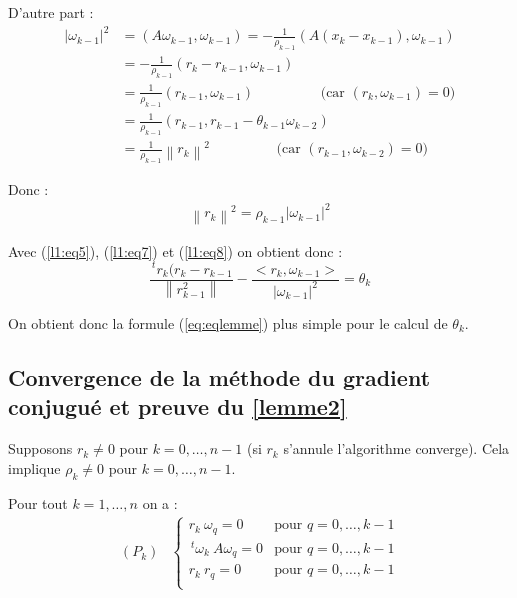 \documentclass[a4paper,11pt]{article}
\newcommand{\norm}[1]{\left\lVert#1\right\rVert}
\newcommand{\tpo}[1]{\,^t#1}
\theoremstyle{plain} %
\begin{document}
D'autre part :
\begin{align*}
    |\omega_{k-1}|^2 & = (A \omega_{k-1}, \omega_{k-1}) = -\frac{1}{\rho_{k-1}}(A (x_k - x_{k-1}), \omega_{k-1}) \\
    & = -\frac{1}{\rho_{k-1}}(r_k - r_{k-1} , \omega_{k-1}) \\
    & = \frac{1}{\rho_{k-1}}(r_{k-1}, \omega_{k-1}) \hspace{2cm} \text{(car $(r_k,\omega_{k-1}) = 0$)}\\
    & = \frac{1}{\rho_{k-1}}(r_{k-1},r_{k-1}- \theta_{k-1}\omega_{k-2}) \\
    & = \frac{1}{\rho_{k-1}}\norm{r_k}^2 \hspace{2cm} \text{(car $(r_{k-1}, \omega_{k-2}) = 0$)}
\end{align*}

Donc :
\begin{align}
    \norm{r_k}^2 = \rho_{k-1} |\omega_{k-1}|^2
    \label{l1:eq8}
\end{align}

Avec (\ref{l1:eq5}), (\ref{l1:eq7}) et (\ref{l1:eq8}) on obtient donc :
\[
    \frac{\tpo r_k (r_k - r_{k-1}}{\norm{r_{k-1}^2}}  - \frac{<r_k,\omega_{k-1}>}{|\omega_{k-1}|^2} = \theta_k
\]

On obtient donc la formule (\ref{eq:eqlemme}) plus simple pour le calcul de $\theta_k$.

\subsection{Convergence de la méthode du gradient conjugué et preuve du \ref{lemme2}}

Supposons $r_k \ne 0$ pour $k = 0,\dots,n-1$ (si $r_k$ s'annule l'algorithme converge). Cela implique
$\rho_k \ne 0$ pour $k=0,\dots,n-1$.

\begin{lemme}
    Pour tout $k=1,\dots,n$ on a :
    \[
        \begin{array}{cc}
            (P_k) &
            \left\lbrace
            \begin{array}{cc}
                r_k \: \omega_q = 0 & \text{pour $q = 0,\dots,k-1$} \\
                \tpo \omega_k \: A \omega_q = 0 & \text{pour $q = 0,\dots,k-1$} \\
                r_k \: r_q = 0 & \text{pour $q = 0,\dots,k-1$} \\
            \end{array}
            \right.
        \end{array}
    \]
    \label{lemme3}
\end{lemme}
\end{document}
